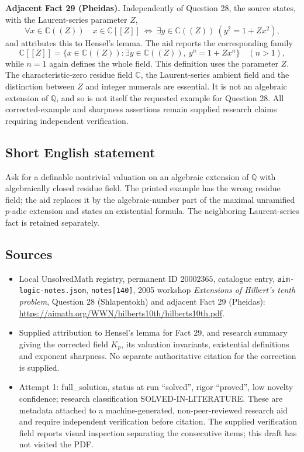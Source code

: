 \documentclass[11pt]{article}
\newcommand{\Q}{\mathbb{Q}}
\newcommand{\C}{\mathbb{C}}
\begin{document}
\textbf{Adjacent Fact 29 (Pheidas).} Independently of Question 28, the source states, with the Laurent-series parameter \(Z\),
\[
 \forall x\in\C((Z))\quad
 x\in\C[[Z]]\ \Longleftrightarrow\
 \exists y\in\C((Z))\ (y^2=1+Zx^2),
\]
and attributes this to Hensel's lemma. The aid reports the corresponding family
\[
 \C[[Z]]=\{x\in\C((Z)):\exists y\in\C((Z)),\ y^n=1+Zx^n\}
 \quad(n>1),
\]
while \(n=1\) again defines the whole field. This definition uses the parameter \(Z\). The characteristic-zero residue field \(\C\), the Laurent-series ambient field and the distinction between \(Z\) and integer numerals are essential. It is not an algebraic extension of \(\Q\), and so is not itself the requested example for Question 28. All corrected-example and sharpness assertions remain supplied research claims requiring independent verification.
\subsection{Short English statement}
Ask for a definable nontrivial valuation on an algebraic extension of \(\Q\) with algebraically closed residue field. The printed example has the wrong residue field; the aid replaces it by the algebraic-number part of the maximal unramified \(p\)-adic extension and states an existential formula. The neighboring Laurent-series fact is retained separately.
\subsection{Sources}
\begin{itemize}
\item Local UnsolvedMath registry, permanent ID \(20002365\), catalogue entry, \texttt{aim-logic-notes.json}, \texttt{notes[140]}, 2005 workshop \emph{Extensions of Hilbert's tenth problem}, Question 28 (Shlapentokh) and adjacent Fact 29 (Pheidas): \url{https://aimath.org/WWN/hilberts10th/hilberts10th.pdf}.
\item Supplied attribution to Hensel's lemma for Fact 29, and research summary giving the corrected field \(K_p\), its valuation invariants, existential definitions and exponent sharpness. No separate authoritative citation for the correction is supplied.
\item Attempt 1: full\_solution, status at run ``solved'', rigor ``proved'', low novelty confidence; research classification SOLVED-IN-LITERATURE. These are metadata attached to a machine-generated, non-peer-reviewed research aid and require independent verification before citation. The supplied verification field reports visual inspection separating the consecutive items; this draft has not visited the PDF.
\end{itemize}
\end{document}
